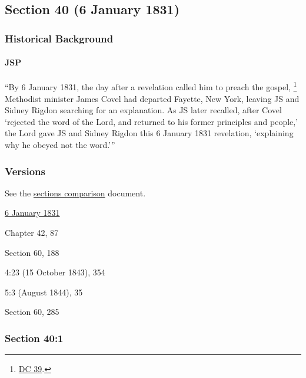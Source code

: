 \subsection{Section 40 (6 January 1831)}
	\label{DC40}
	
	\subsubsection{Historical Background}
		\label{DC40-HB}
		
		\paragraph{JSP}
		
			``By 6 January 1831, the day after a revelation called him to preach the gospel,%
			\footnote{%
				\hyperref[DC39]{DC 39}.
				}
			Methodist minister James Covel had departed Fayette, New York, leaving JS and Sidney Rigdon searching for an explanation. As JS later recalled, after Covel `rejected the word of the Lord, and returned to his former principles and people,' the Lord gave JS and Sidney Rigdon this 6 January 1831 revelation, `explaining why he obeyed not the word.'''
			
	\subsubsection{Versions}
		\label{DC40-V}
		
		See the \href{https://drive.google.com/file/d/1goAvNz8jS4R8slYfMG_db55Ty2z_vmgK/view?usp=sharing}{sections comparison} document.
	
		\begin{compactdesc}
			\item[JSP] \hyperref[EMS-1831-JS-6-JAN-1831]{6 January 1831}
			\item[BC] Chapter 42, 87
			\item[DC 1835] Section 60, 188
			\item[TS] 4:23 (15 October 1843), 354
			\item[MS] 5:3 (August 1844), 35
			\item[DC 1844] Section 60, 285
		\end{compactdesc}

	\subsubsection{Section 40:1} %
		\label{DC40-1}

